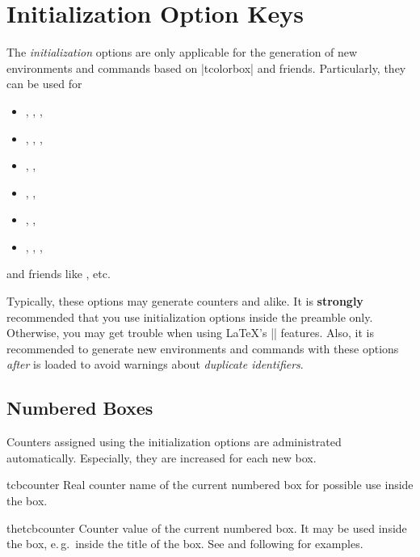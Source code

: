 \clearpage
\section{Initialization Option Keys}\label{sec:initkeys}%
%
The \emph{initialization} options are only applicable for the generation
of new environments and commands based on |tcolorbox| and friends.
Particularly, they can be used for
\begin{itemize}
\item{}, , ,
\item{}, , ,
\item{}, ,
\item{}, ,
\item{}, ,
\item{}, , ,
\end{itemize}
and friends like , etc.

\bigskip
\begin{marker}
Typically, these options may generate counters and alike.
It is \textbf{strongly} recommended that you use initialization options inside
the preamble only. Otherwise, you may get trouble when using \LaTeX's || features.
Also, it is recommended to generate new environments and commands with these
options \emph{after}  is loaded to avoid warnings about
\emph{duplicate identifiers}.
\end{marker}


\subsection{Numbered Boxes}\label{sec:numberedboxes}
Counters assigned using the initialization options are administrated
automatically. Especially, they are increased for each new box.


\begin{docCommand}{tcbcounter}{}
Real counter name of the current numbered box for possible use inside the box.
\end{docCommand}

\begin{docCommand}{thetcbcounter}{}
Counter value of the current numbered box. It may be used inside the box,
e.\,g.\ inside the title of
the box. See  and following for examples.
\end{docCommand}

